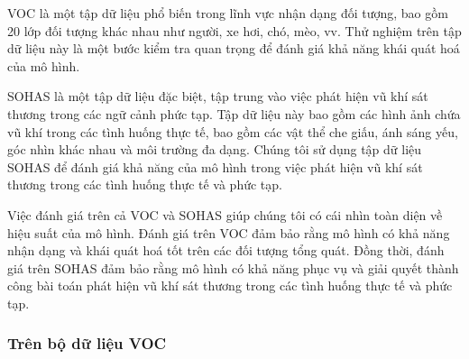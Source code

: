 \documentclass[a4paper]{article}
\begin{document}
VOC là một tập dữ liệu phổ biến trong lĩnh vực nhận dạng đối tượng, bao gồm 20 lớp đối tượng khác nhau như người, xe hơi, chó, mèo, vv. Thử nghiệm trên tập dữ liệu này là một bước kiểm tra quan trọng để đánh giá khả năng khái quát hoá của mô hình. 

SOHAS là một tập dữ liệu đặc biệt, tập trung vào việc phát hiện vũ khí sát thương trong các ngữ cảnh phức tạp. Tập dữ liệu này bao gồm các hình ảnh chứa vũ khí trong các tình huống thực tế, bao gồm các vật thể che giấu, ánh sáng yếu, góc nhìn khác nhau và môi trường đa dạng. Chúng tôi sử dụng tập dữ liệu SOHAS để đánh giá khả năng của mô hình trong việc phát hiện vũ khí sát thương trong các tình huống thực tế và phức tạp.

Việc đánh giá trên cả VOC và SOHAS giúp chúng tôi có cái nhìn toàn diện về hiệu suất của mô hình. Đánh giá trên VOC đảm bảo rằng mô hình có khả năng nhận dạng và khái quát hoá tốt trên các đối tượng tổng quát. Đồng thời, đánh giá trên SOHAS đảm bảo rằng mô hình có khả năng phục vụ và giải quyết thành công bài toán phát hiện vũ khí sát thương trong các tình huống thực tế và phức tạp. 

\subsubsection{\textbf{Trên bộ dữ liệu VOC}}
\end{document}
